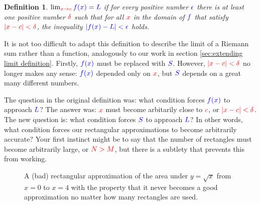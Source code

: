 \documentclass{myarticle}
\newcommand{\hor}[1]{\textcolor{red}{#1}}
\newcommand{\ver}[1]{\textcolor{blue}{#1}}
\theoremstyle{nospace}
\newtheorem*{oldattempt}{Definition}
\newenvironment{attempt}
{\begin{mdframed}\begin{oldattempt}}
    {\end{oldattempt}\end{mdframed}}
\newtheorem{old series theorem}{Theorem}
\newenvironment{series theorem}
{\begin{mdframed}\begin{old series theorem}}
    {\end{old series theorem}\end{mdframed}}
\begin{document}
\begin{attempt}
  $\lim_{\hor{x \to c}} \ver{f(x)} = \ver{L}$ if for every positive
  number $\ver{\epsilon}$ there is at least one positive number
  $\hor{\delta}$ such that for all $\hor{x}$ in the domain of
  $\ver{f}$ that satisfy $\hor{|x - c| < \delta}$, the inequality
  $\ver{|f(x) - L| < \epsilon}$ holds.
\end{attempt}

It is not too difficult to adapt this definition to describe the limit
of a Riemann sum rather than a function, analogously to our work in
section \ref{sec:extending limit definition}. Firstly, $\ver{f(x)}$
must be replaced with $\ver{S}$. However, $\hor{|x - c| < \delta}$ no
longer makes any sense: $\ver{f(x)}$ depended only on $\hor{x}$, but
$\ver{S}$ depends on a great many different numbers.

The question in the original definition was: what condition forces
$\ver{f(x)}$ to approach $\ver{L}$? The answer was: $\hor{x}$ must
become arbitarily close to $\hor{c}$, or $\hor{|x - c| < \delta}$. The
new question is: what condition forces $\ver{S}$ to approach
$\ver{L}$? In other words, what condition forces our rectangular
approximations to become arbitrarily accurate? Your first instinct
might be to say that the number of rectangles must become arbitrarily
large, or $\hor{N > M}$, but there is a subtlety that prevents this
from working.

\begin{figure}[htb!] \centering
  \caption{A (bad) rectangular approximation of the area under
    $y = \sqrt{x}$ from $x = 0$ to $x = 4$ with the property that it
    never becomes a good approximation no matter how many rectangles
    are used.}
  \label{fig:bad approximation}
\end{figure}
\end{document}
